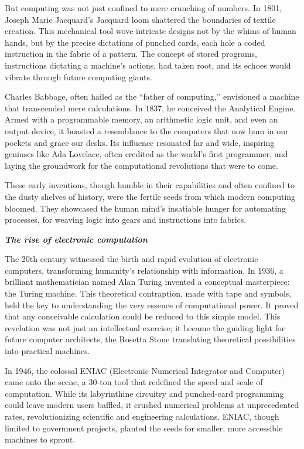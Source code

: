 \documentclass[
  letterpaper,
  DIV=11,
  numbers=noendperiod]{scrreprt}
\begin{document}
But computing was not just confined to mere crunching of numbers. In
1801, Joseph Marie Jacquard's Jacquard loom shattered the boundaries of
textile creation. This mechanical tool wove intricate designs not by the
whims of human hands, but by the precise dictations of punched cards,
each hole a coded instruction in the fabric of a pattern. The concept of
stored programs, instructions dictating a machine's actions, had taken
root, and its echoes would vibrate through future computing giants.

Charles Babbage, often hailed as the ``father of computing,'' envisioned
a machine that transcended mere calculations. In 1837, he conceived the
Analytical Engine. Armed with a programmable memory, an arithmetic logic
unit, and even an output device, it boasted a resemblance to the
computers that now hum in our pockets and grace our desks. Its influence
resonated far and wide, inspiring geniuses like Ada Lovelace, often
credited as the world's first programmer, and laying the groundwork for
the computational revolutions that were to come.

These early inventions, though humble in their capabilities and often
confined to the dusty shelves of history, were the fertile seeds from
which modern computing bloomed. They showcased the human mind's
insatiable hunger for automating processes, for weaving logic into gears
and instructions into fabrics.

\textbf{\emph{The rise of electronic computation}}

The 20th century witnessed the birth and rapid evolution of electronic
computers, transforming humanity's relationship with information. In
1936, a brilliant mathematician named Alan Turing invented a conceptual
masterpiece: the Turing machine. This theoretical contraption, made with
tape and symbols, held the key to understanding the very essence of
computational power. It proved that any conceivable calculation could be
reduced to this simple model. This revelation was not just an
intellectual exercise; it became the guiding light for future computer
architects, the Rosetta Stone translating theoretical possibilities into
practical machines.

In 1946, the colossal ENIAC (Electronic Numerical Integrator and
Computer) came onto the scene, a 30-ton tool that redefined the speed
and scale of computation. While its labyrinthine circuitry and
punched-card programming could leave modern users baffled, it crushed
numerical problems at unprecedented rates, revolutionizing scientific
and engineering calculations. ENIAC, though limited to government
projects, planted the seeds for smaller, more accessible machines to
sprout.
\end{document}
